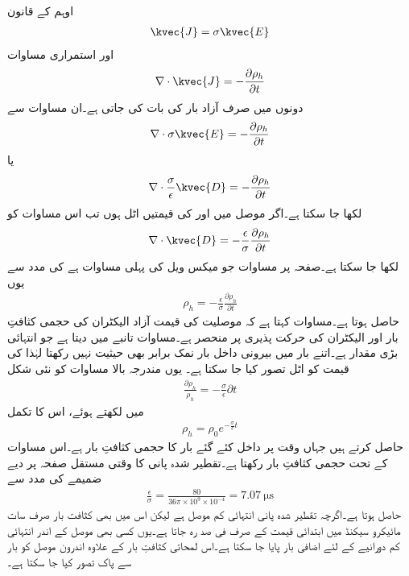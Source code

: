 اوہم کے قانون
\begin{align*}
\kvec{J}=\sigma \kvec{E}
\end{align*}
اور استمراری مساوات
\begin{align*}
\nabla \cdot \kvec{J}=-\frac{\partial \rho_h}{\partial t}
\end{align*} 
دونوں میں صرف آزاد بار کی بات کی جاتی ہے۔ان مساوات سے
\begin{align*}
\nabla \cdot \sigma \kvec{E}=-\frac{\partial \rho_h}{\partial t}
\end{align*} 
یا
\begin{align*}
\nabla \cdot \frac{\sigma}{\epsilon} \kvec{D}=-\frac{\partial \rho_h}{\partial t}
\end{align*} 
لکھا جا سکتا ہے۔اگر موصل میں  اور  کی قیمتیں اٹل ہوں تب اس مساوات کو
\begin{align*}
\nabla \cdot  \kvec{D}=-\frac{\epsilon}{\sigma}\frac{\partial \rho_h}{\partial t}
\end{align*} 
لکھا جا سکتا ہے۔صفحہ  پر مساوات  جو میکس ویل کی پہلی مساوات ہے کی مدد سے یوں
\begin{align*}
\rho_h=-\frac{\epsilon}{\sigma}\frac{\partial \rho_h}{\partial t}
\end{align*} 
حاصل ہوتا ہے۔مساوات  کہتا ہے کہ موصلیت کی قیمت آزاد الیکٹران کی حجمی کثافتِ بار  اور الیکٹران کی حرکت پذیری پر منحصر ہے۔مساوات  تانبے میں  دیتا ہے جو انتہائی بڑی مقدار ہے۔اتنے بار میں بیرونی داخل بار نمک برابر بھی حیثیت نہیں رکھتا لہٰذا  کی قیمت کو اٹل تصور کیا جا سکتا ہے۔ یوں مندرجہ بالا مساوات کو نئی شکل
\begin{align*}
\frac{\partial \rho_h}{\rho_h}=-\frac{\sigma}{\epsilon} \partial t
\end{align*} 
میں لکھتے ہوئے، اس کا تکمل
\begin{align*}
\rho_h=\rho_0 e^{-\frac{\sigma}{\epsilon}t}
\end{align*}
 حاصل کرتے ہیں جہاں وقت  پر داخل کئے گئے بار کا حجمی کثافتِ بار  ہے۔اس مساوات کے تحت حجمی کثافتِ بار   رکھتا ہے۔تقطیر شدہ پانی کا وقتی مستقل صفحہ  پر دیے ضمیمے کی مدد سے
\begin{align*}
\frac{\epsilon}{\sigma}=\frac{80}{36 \pi \times 10^9 \times 10^{-4}}=\SI{7.07}{\micro \second}
\end{align*}
حاصل ہوتا ہے۔اگرچہ تقطیر شدہ پانی انتہائی کم موصل ہے لیکن اس میں بھی  کثافت بار صرف سات مائیکرو سیکنڈ میں ابتدائی قیمت کے صرف   فی صد رہ جاتا ہے۔یوں کسی بھی موصل کے اندر انتہائی کم دورانیے کے لئے اضافی بار پایا جا سکتا ہے۔اس لمحاتی کثافتِ بار کے علاوہ اندرون موصل  کو بار سے پاک تصور کیا جا سکتا ہے۔

